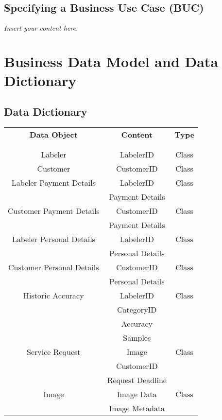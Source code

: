 \documentclass[12pt]{article}
\newcommand{\lips}{\textit{Insert your content here.}}
\begin{document}
\subsection{Specifying a Business Use Case (BUC)}
\lips

\section{Business Data Model and Data Dictionary}
\subsection{Data Dictionary}
\begin{center}
\begin{tabular}{ |c|c|c| } %
  \hline
    \textbf{Data Object} & \hspace{80pt} \textbf{Content} \hspace{80pt} & \textbf{Type} \\
    & & \\
    & & \\
    \hline
    Labeler &  LabelerID & Class \\ 
    \hline
    Customer &  CustomerID & Class \\ 
    \hline
    Labeler Payment Details &  LabelerID & Class \\ 
    &  Payment Details & \\
    \hline
    Customer Payment Details &  CustomerID & Class \\ 
    &  Payment Details & \\
    \hline
    Labeler Personal Details &  LabelerID & Class \\ 
    &  Personal Details & \\
    \hline
    Customer Personal Details &  CustomerID & Class \\ 
    &  Personal Details & \\
    \hline
    Historic Accuracy &  LabelerID & Class \\ 
    &  CategoryID & \\
    &  Accuracy & \\
    &  Samples & \\
    \hline
    Service Request &  Image & Class \\ 
    &  CustomerID & \\
    &  Request Deadline & \\
    \hline
    Image &  Image Data & Class \\ 
    &  Image Metadata & \\

\end{tabular}
\end{center}
\end{document}
